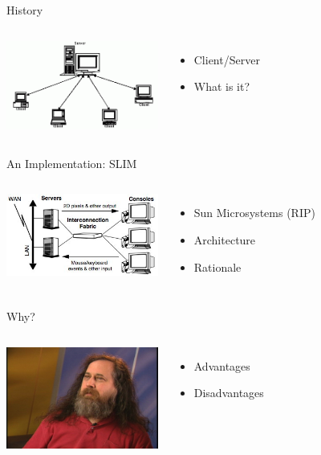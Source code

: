 \documentclass{beamer}
\begin{document}
\begin{frame}{History}
  \begin{columns}
    \column{5cm}
      \includegraphics[width=5cm]{clientServer.png}
    \column{5cm}
      \begin{itemize}
      \item Client/Server
      \item What is it?
      \end{itemize}
  \end{columns}
\end{frame}

\begin{frame}{An Implementation: SLIM}
  \begin{columns}
    \column{5cm}
      \includegraphics[width=5cm]{slimArchitecture.jpg}
    \column{5cm}
      \begin{itemize}
      \item Sun Microsystems (RIP)
      \item Architecture
      \item Rationale
      \end{itemize}
  \end{columns}
\end{frame}

\begin{frame}{Why?}
  \begin{columns}
    \column{5cm}
      \includegraphics[width=5cm]{unixGeek.jpg}
    \column{5cm}
      \begin{itemize}
      \item Advantages
      \item Disadvantages
      \end{itemize}
  \end{columns}
\end{frame}
\end{document}
